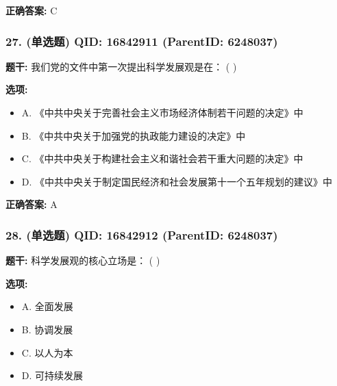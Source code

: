 \documentclass[12pt,UTF8]{ctexart}
\begin{document}
\textbf{正确答案:}
C

\vspace{0.3em}\hrulefill\vspace{0.7em}

\subsubsection*{27. (单选题) \small QID: 16842911 (ParentID: 6248037)}

\textbf{题干:}
我们党的文件中第一次提出科学发展观是在： ( )



\textbf{选项:}
\begin{itemize}[leftmargin=*]

  \item A. 《中共中央关于完善社会主义市场经济体制若干问题的决定》中

  \item B. 《中共中央关于加强党的执政能力建设的决定》中

  \item C. 《中共中央关于构建社会主义和谐社会若干重大问题的决定》中

  \item D. 《中共中央关于制定国民经济和社会发展第十一个五年规划的建议》中

\end{itemize}

\textbf{正确答案:}
A

\vspace{0.3em}\hrulefill\vspace{0.7em}

\subsubsection*{28. (单选题) \small QID: 16842912 (ParentID: 6248037)}

\textbf{题干:}
科学发展观的核心立场是： ( )



\textbf{选项:}
\begin{itemize}[leftmargin=*]

  \item A. 全面发展

  \item B. 协调发展

  \item C. 以人为本

  \item D. 可持续发展

\end{itemize}
\end{document}
